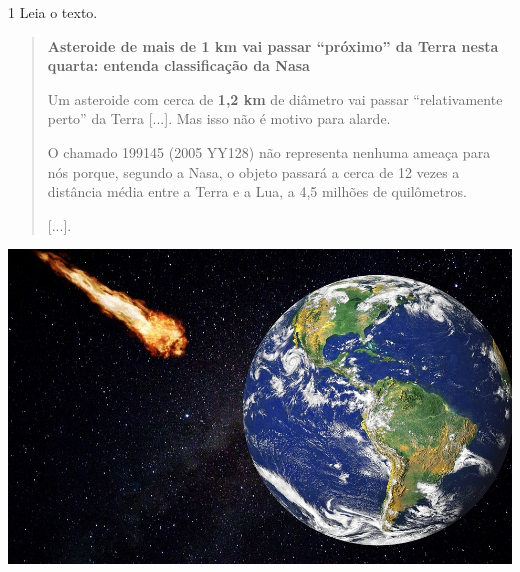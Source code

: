 


\num{1} Leia o texto.\medskip

\begin{minipage}{.5\textwidth}
\begin{quote}
\textbf{Asteroide de mais de 1 km vai passar “próximo” da Terra nesta
quarta: entenda classificação da Nasa}

Um asteroide com cerca de \textbf{1,2 km} de diâmetro vai passar
“relativamente perto” da Terra {[}...{]}. Mas
isso não é motivo para alarde.

O chamado 199145 (2005 YY128) não representa nenhuma ameaça para nós
porque, segundo a Nasa, o
objeto passará a cerca de 12 vezes a distância média entre a Terra e a
Lua, a 4,5 milhões de quilômetros.

{[}...{]}.
\end{quote}
\end{minipage}\hspace{.2cm}
\begin{minipage}{.5\textwidth}
\includegraphics[width=\textwidth]{./imgs/img3.jpg}
\end{minipage}



